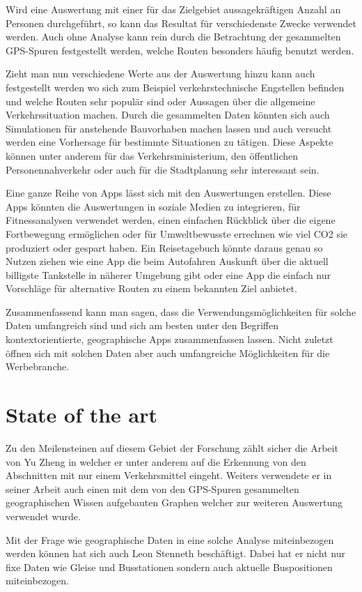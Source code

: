 Wird eine Auswertung mit einer für das Zielgebiet aussagekräftigen Anzahl an Personen durchgeführt, so kann das Resultat  für verschiedenste Zwecke verwendet werden. Auch ohne  Analyse kann rein durch die Betrachtung der gesammelten GPS-Spuren festgestellt werden, welche Routen besonders häufig benutzt werden. 

Zieht man nun verschiedene Werte aus der Auswertung hinzu kann auch festgestellt werden wo sich zum Beispiel verkehrstechnische Engstellen befinden und welche Routen sehr populär sind oder Aussagen über die allgemeine Verkehrssituation machen. Durch die gesammelten Daten könnten sich auch Simulationen für anstehende Bauvorhaben machen lassen und auch versucht werden eine Vorhersage für bestimmte Situationen zu tätigen. Diese Aspekte können unter anderem für das Verkehrsministerium,  den öffentlichen Personennahverkehr oder auch für die Stadtplanung sehr interessant sein.

Eine ganze Reihe von Apps lässt sich mit den Auswertungen erstellen. Diese Apps könnten die Auswertungen in soziale Medien zu integrieren, für Fitnessanalysen verwendet werden, einen einfachen Rückblick über die eigene Fortbewegung ermöglichen oder für Umweltbewusste errechnen wie viel CO2 sie produziert oder gespart haben. Ein Reisetagebuch könnte daraus genau so Nutzen ziehen wie eine App die beim Autofahren Auskunft über die aktuell billigste Tankstelle in näherer Umgebung gibt oder eine App die einfach nur Vorschläge für alternative Routen zu einem bekannten Ziel anbietet.

Zusammenfassend kann man sagen, dass die Verwendungsmöglichkeiten für solche Daten umfangreich sind und sich am besten unter den Begriffen kontextorientierte, geographische Apps zusammenfassen lassen. Nicht zuletzt öffnen sich mit solchen Daten aber auch umfangreiche Möglichkeiten für die Werbebranche.

\section{State of the art}
Zu den Meilensteinen auf diesem Gebiet der Forschung zählt sicher die Arbeit von Yu Zheng in welcher er unter anderem auf die Erkennung von den Abschnitten mit nur einem Verkehrsmittel eingeht. Weiters verwendete er in seiner Arbeit auch einen mit dem von den GPS-Spuren gesammelten geographischen Wissen aufgebauten Graphen welcher zur weiteren Auswertung verwendet wurde.\cite{zheng_understanding_2010}

Mit der Frage wie geographische Daten in eine solche Analyse miteinbezogen werden können hat sich auch Leon Stenneth beschäftigt. Dabei hat er nicht nur fixe Daten wie Gleise und Busstationen sondern auch aktuelle Buspositionen miteinbezogen. \cite{stenneth_transportation_2011}

